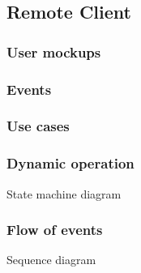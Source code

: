 %
\subsection{Remote Client}
\label{sec:remote-cli-decomp}

\subsubsection{User mockups}
\label{sec:user-mockups-1}

\subsubsection{Events}
\label{sec:events-1}

\subsubsection{Use cases}
\label{sec:use-cases-1}

\subsubsection{Dynamic operation}
\label{sec:dyn-oper-1}
State machine diagram

\subsubsection{Flow of events}
\label{sec:flow-events-1}
Sequence diagram

